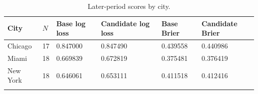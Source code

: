 \begin{table}[htbp]\centering
{\fontsize{9.4}{12}\selectfont\renewcommand{\arraystretch}{1.18}\setlength{\tabcolsep}{4pt}
\begin{tabularx}{\linewidth}{@{}L{23mm}C{11mm}C{32mm}C{35mm}C{28mm}X@{}}\toprule{}
\textbf{City} & \textbf{$N$} & \textbf{Base log loss} & \textbf{Candidate log loss} & \textbf{Base Brier} & \textbf{Candidate Brier} \\ \midrule
Chicago & 17 & 0.847000 & 0.847490 & 0.439558 & 0.440986 \\ \hline
Miami & 18 & 0.669839 & 0.672819 & 0.375481 & 0.376419 \\ \hline
New York & 18 & 0.646061 & 0.653111 & 0.411518 & 0.412416 \\ \hline
{}\bottomrule\end{tabularx}}
\caption[Later-period scores by city]{Later-period scores by city.}\label{tab:cities}
\end{table}
